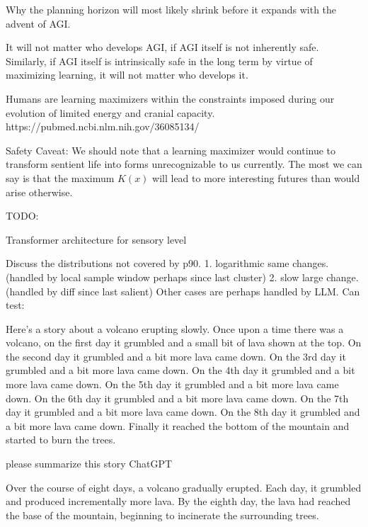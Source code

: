 \documentclass{article}
\begin{document}
Why the planning horizon will most likely shrink before it expands with the advent of AGI.

It will not matter who develops AGI, if AGI itself is not inherently safe.
Similarly, if AGI itself is intrinsically safe in the long term by virtue of maximizing learning,
it will not matter who develops it.

Humans are learning maximizers within the constraints imposed during our evolution of limited energy and cranial capacity.  https://pubmed.ncbi.nlm.nih.gov/36085134/

Safety Caveat: We should note that a learning maximizer would continue to transform
sentient life into forms unrecognizable to us currently.
The most we can say is that the maximum $K(x)$ will
lead to more interesting futures than would arise otherwise.


TODO:

Transformer architecture for sensory level

Discuss the distributions not covered by p90.
1. logarithmic same changes. (handled by local sample window perhaps since last cluster)
2. slow large change. (handled by diff since last salient)
Other cases are perhaps handled by LLM. Can test:

Here's a story about a volcano erupting slowly. Once upon a time there was a volcano, on the first day it grumbled and a small bit of lava shown at the top. On the second day it grumbled and a bit more lava came down. On the 3rd day it grumbled and a bit more lava came down. On the 4th day it grumbled and a bit more lava came down. On the 5th day it grumbled and a bit more lava came down. On the 6th day it grumbled and a bit more lava came down. On the 7th day it grumbled and a bit more lava came down. On the 8th day it grumbled and a bit more lava came down. Finally it reached the bottom of the mountain and started to burn the trees.

please summarize this story
ChatGPT

Over the course of eight days, a volcano gradually erupted. Each day, it grumbled and produced incrementally more lava. By the eighth day, the lava had reached the base of the mountain, beginning to incinerate the surrounding trees.



\end{document}

